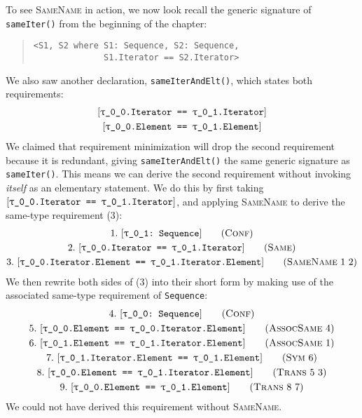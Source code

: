 \documentclass[../generics]{subfiles}
\begin{document}
\begin{example}\label{same name rule example}
To see \textsc{SameName} in action, we now look recall the generic signature of \texttt{sameIter()} from the beginning of the chapter:
\begin{quote}
\begin{verbatim}
<S1, S2 where S1: Sequence, S2: Sequence,
              S1.Iterator == S2.Iterator>
\end{verbatim}
\end{quote}
We also saw another declaration, \texttt{sameIterAndElt()}, which states both requirements:
\begin{gather*}
\SameReq{\rT.Iterator}{\rU.Iterator}\\
\SameReq{\rT.Element}{\rU.Element}
\end{gather*}
We claimed that requirement minimization will drop the second requirement because it is redundant, giving \texttt{sameIterAndElt()} the same generic signature as \texttt{sameIter()}. This means we can derive the second requirement without invoking \emph{itself} as an elementary statement. We do this by first taking $[\texttt{\texttt{$\uptau$\_0\_0}.Iterator == \texttt{$\uptau$\_0\_1}.Iterator}]$, and applying \textsc{SameName} to derive the same-type requirement (3):
\begin{gather*}
\ConfStep{\rU}{Sequence}{1}\\
\SameStep{\rT.Iterator}{\rU.Iterator}{2}\\
\SameNameStep{1}{2}{\rT.Iterator.Element}{\rU.Iterator.Element}{3}
\end{gather*}
We then rewrite both sides of (3) into their short form by making use of the associated same-type requirement of \texttt{Sequence}:
\begin{gather*}
\ConfStep{\rT}{Sequence}{4}\\
\AssocSameStep{4}{\rT.Element}{\rT.Iterator.Element}{5}\\
\AssocSameStep{1}{\rU.Element}{\rU.Iterator.Element}{6}\\
\SymStep{6}{\rU.Iterator.Element}{\rU.Element}{7}\\
\TransStep{5}{3}{\rT.Element}{\rU.Iterator.Element}{8}\\
\TransStep{8}{7}{\rT.Element}{\rU.Element}{9}
\end{gather*}
We could not have derived this requirement without \textsc{SameName}.
\end{example}
\end{document}
